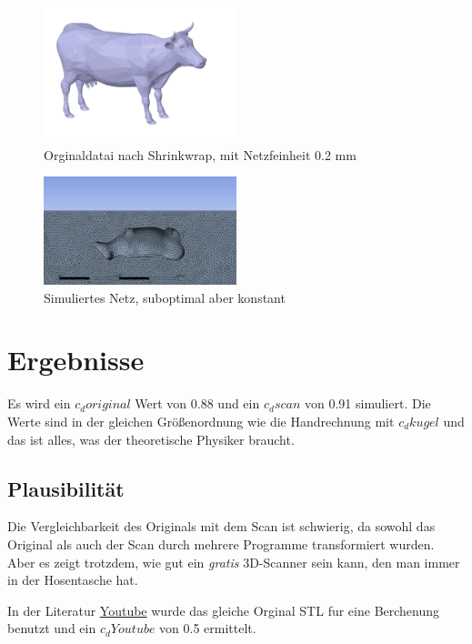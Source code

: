 \documentclass[a4paper,12pt]{article}
\begin{document}
\begin{figure}[h]
    \centering
    \includegraphics[width=0.5\textwidth]{cowremesh.PNG}
    \caption{Orginaldatai nach Shrinkwrap, mit Netzfeinheit 0.2 mm}
    \label{fig:02mesh}
\end{figure}


\begin{figure}[h]
    \centering
    \includegraphics[width=0.5\textwidth]{nwtz.PNG}
    \caption{Simuliertes Netz, suboptimal aber konstant}
    \label{fig:netz}
\end{figure}

\section{Ergebnisse}
Es wird ein \( c_d original \) Wert von 0.88 und ein \( c_d scan \) von 0.91 simuliert. Die Werte sind in der gleichen Größenordnung wie die Handrechnung mit \( c_d kugel \) und das ist alles, was der theoretische Physiker braucht.

\subsection{Plausibilität}
Die Vergleichbarkeit des Originals mit dem Scan ist schwierig, da sowohl das Original als auch der Scan durch mehrere Programme transformiert wurden. Aber es zeigt trotzdem, wie gut ein \textit{gratis} 3D-Scanner sein kann, den man immer in der Hosentasche hat.

In der Literatur \href{https://www.youtube.com/watch?v=FDG3rUx00yQ}{Youtube} wurde das gleiche Orginal STL fur eine Berchenung benutzt und ein  \( c_d Youtube \) von 0.5 ermittelt.
\end{document}
